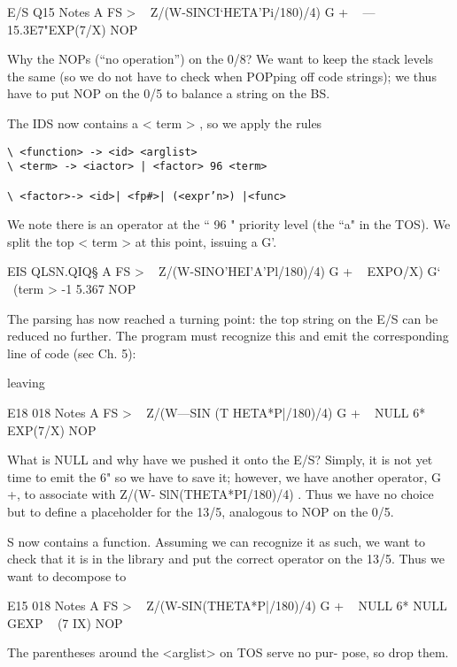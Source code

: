  

E/S Q15 Notes
A FS > \ < subject >
Z/(W-SINCI‘HETA'Pi/180)/4) G + \ < term >
—15.3E7"EXP(7/X) NOP \ < term >

Why the NOPs (“no operation”) on the 0/8? We want to keep
the stack levels the same (so we do not have to check when
POPping off code strings); we thus have to put NOP on the 0/5
to balance a string on the BS.

The IDS now contains a < term > , so we apply the rules
\begin{verbatim}
\ <function> -> <id> <arglist>
\ <term> -> <iactor> | <factor> 96 <term>

\ <factor>-> <id>| <fp#>| (<expr’n>) |<func>
\end{verbatim}

We note there is an operator at the “ 96 " priority level (the “a"
in the TOS). We split the top < term > at this point, issuing a G'.

 

EIS QLSN.QIQ§
A FS > \ < subject >
Z/(W-SINO’HEI'A'Pl/180)/4) G + \ < term >
EXPO/X) G‘ \ (term >
-1 5.367 NOP


The parsing has now reached a turning point: the top string on
the E/S can be reduced no further. The program must recognize
this and emit the corresponding line of code (sec Ch. 5):


 

leaving

E18 018 Notes
A FS > \ < subject >
Z/(W—SIN (T HETA*P|/180)/4) G + \ < term >
NULL 6*
EXP(7/X) NOP \ < function >

What is NULL and why have we pushed it onto the E/S? Simply,
it is not yet time to emit the 6" so we have to save it; however,
we have another operator, G +, to associate with Z/(W-
SlN(THETA*PI/180)/4) . Thus we have no choice but to define a
placeholder for the 13/5, analogous to NOP on the 0/5.

S now contains a function. Assuming we can recognize it as
such, we want to check that it is in the library and put the
correct operator on the 13/5. Thus we want to decompose to

 

E15 018 Notes
A FS > \ < subject >
Z/(W-SIN(THETA*P|/180)/4) G + \ < term >
NULL 6*
NULL GEXP \ < function >
(7 IX) NOP \ < arglist >

The parentheses around the <arglist> on TOS serve no pur-
pose, so drop them.

